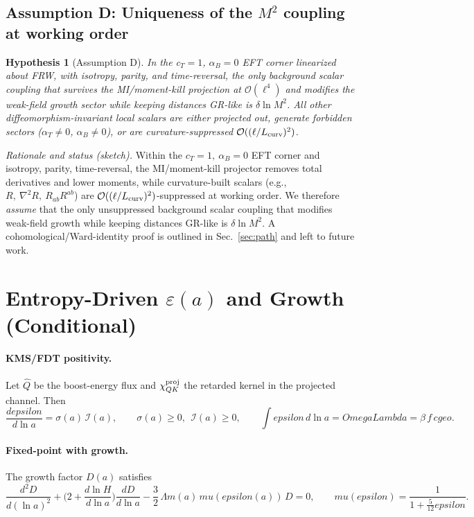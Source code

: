 \documentclass[aps,prd,onecolumn,superscriptaddress,nofootinbib]{revtex4-2}
\def\OmL{OmegaLambda}%
\def\cgeo{cgeo}%
\def\eps{epsilon}%
\def\mu{mu}%
\def\alpha{alpha}%
\def\alpha_M{alphaM}%
\def\Omega_\Lambda{OmegaLambda}%
\providecommand{\OmL}{\Omega_\Lambda}
\providecommand{\cgeo}{c_{\rm geo}}
\providecommand{\eps}{\varepsilon}
\providecommand{\be}{\begin{equation}}
\providecommand{\ee}{\end{equation}}
\newtheorem{hypothesis}{Hypothesis}
\begin{document}
\subsection{Assumption D: Uniqueness of the \texorpdfstring{$M^2$}{M^2} coupling at working order}
\label{sec:lemmaD}

\begin{hypothesis}[Assumption D]
In the c\(_T\!=\!1\), \(\alpha_B\!=\!0\) EFT corner linearized about FRW, with isotropy, parity, and time-reversal, the only background scalar coupling that survives the MI/moment-kill projection at \(\mathcal O(\ell^4)\) and modifies the weak-field growth sector while keeping distances GR-like is \(\delta\ln M^2\). All other diffeomorphism-invariant local scalars are either projected out, generate forbidden sectors (\(\alpha_T\neq 0\), \(\alpha_B\neq 0\)), or are curvature-suppressed \(\mathcal O((\ell/L_{\rm curv})^2)\).
\end{hypothesis}

\noindent\emph{Rationale and status (sketch).}
Within the \(c_T=1,\ \alpha_B=0\) EFT corner and isotropy, parity, time-reversal, the MI/moment-kill projector removes total derivatives and lower moments, while curvature-built scalars (e.g., \(R,\ \nabla^2R,\ R_{ab}R^{ab}\)) are \(\mathcal O((\ell/L_{\rm curv})^2)\)-suppressed at working order. We therefore \emph{assume} that the only unsuppressed background scalar coupling that modifies weak-field growth while keeping distances GR-like is \(\delta\ln M^2\). A cohomological/Ward-identity proof is outlined in Sec.~\ref{sec:path} and left to future work.

\section{Entropy-Driven \texorpdfstring{$\varepsilon(a)$}{epsilon(a)} and Growth (Conditional)}
\label{sec:epsilon}

\paragraph{KMS/FDT positivity.}
Let \(\hat Q\) be the boost-energy flux and \(\chi_{QK}^{\rm proj}\) the retarded kernel in the projected channel. Then
\be
\frac{d\eps}{d\ln a}=\sigma(a)\,\mathcal I(a),\qquad \sigma(a)\ge 0,\ \ \mathcal I(a)\ge 0,\qquad
\int \eps\,d\ln a=\OmL=\beta\,f\,\cgeo.
\ee

\paragraph{Fixed-point with growth.}
The growth factor \(D(a)\) satisfies
\be
\frac{d^2 D}{d(\ln a)^2}
+\Big(2+\frac{d\ln H}{d\ln a}\Big)\frac{dD}{d\ln a}
-\frac{3}{2}\,\Omega_m(a)\,\mu(\eps(a))\,D=0,\qquad
\mu(\eps)=\frac{1}{1+\tfrac{5}{12}\eps}.
\ee
\end{document}
